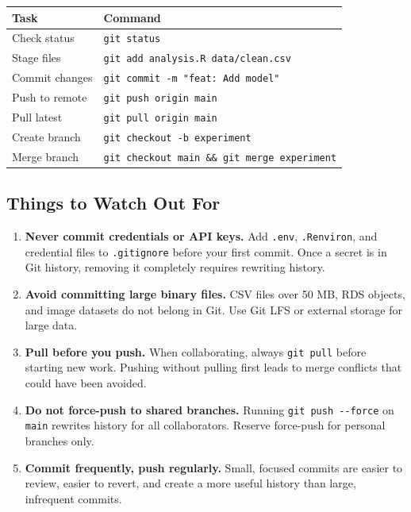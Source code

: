 \documentclass[
  letterpaper,
  DIV=11,
  numbers=noendperiod]{scrartcl}
\newcounter{none} %
\begin{document}
{\def\LTcaptype{none} %
\begin{longtable}[]{@{}ll@{}}
\toprule\noalign{}
Task & Command \\
\midrule\noalign{}
\endhead
\bottomrule\noalign{}
\endlastfoot
Check status & \texttt{git\ status} \\
Stage files & \texttt{git\ add\ analysis.R\ data/clean.csv} \\
Commit changes & \texttt{git\ commit\ -m\ "feat:\ Add\ model"} \\
Push to remote & \texttt{git\ push\ origin\ main} \\
Pull latest & \texttt{git\ pull\ origin\ main} \\
Create branch & \texttt{git\ checkout\ -b\ experiment} \\
Merge branch &
\texttt{git\ checkout\ main\ \&\&\ git\ merge\ experiment} \\
\end{longtable}
}

\subsection{Things to Watch Out For}\label{things-to-watch-out-for}

\begin{enumerate}
\def\labelenumi{\arabic{enumi}.}
\item
  \textbf{Never commit credentials or API keys.} Add \texttt{.env},
  \texttt{.Renviron}, and credential files to \texttt{.gitignore} before
  your first commit. Once a secret is in Git history, removing it
  completely requires rewriting history.
\item
  \textbf{Avoid committing large binary files.} CSV files over 50 MB,
  RDS objects, and image datasets do not belong in Git. Use Git LFS or
  external storage for large data.
\item
  \textbf{Pull before you push.} When collaborating, always
  \texttt{git\ pull} before starting new work. Pushing without pulling
  first leads to merge conflicts that could have been avoided.
\item
  \textbf{Do not force-push to shared branches.} Running
  \texttt{git\ push\ -\/-force} on \texttt{main} rewrites history for
  all collaborators. Reserve force-push for personal branches only.
\item
  \textbf{Commit frequently, push regularly.} Small, focused commits are
  easier to review, easier to revert, and create a more useful history
  than large, infrequent commits.
\end{enumerate}
\end{document}

